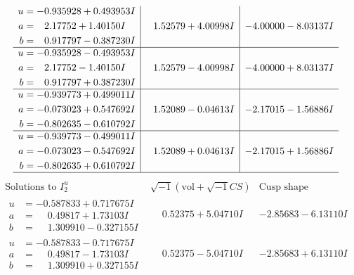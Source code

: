 \documentclass[1p]{elsarticle_modified}
\theoremstyle{definition}
\newcommand{\I}{\sqrt{-1}}
\begin{document}
$$\begin{array}{c|c|c}
\begin{aligned}
u &= -0.935928 + 0.493953 I \\
a &= \phantom{-}2.17752 + 1.40150 I \\
b &= \phantom{-}0.917797 - 0.387230 I\end{aligned}
 & \phantom{-}1.52579 + 4.00998 I & -4.00000 - 8.03137 I \\ \hline\begin{aligned}
u &= -0.935928 - 0.493953 I \\
a &= \phantom{-}2.17752 - 1.40150 I \\
b &= \phantom{-}0.917797 + 0.387230 I\end{aligned}
 & \phantom{-}1.52579 - 4.00998 I & -4.00000 + 8.03137 I \\ \hline\begin{aligned}
u &= -0.939773 + 0.499011 I \\
a &= -0.073023 + 0.547692 I \\
b &= -0.802635 - 0.610792 I\end{aligned}
 & \phantom{-}1.52089 - 0.04613 I & -2.17015 - 1.56886 I \\ \hline\begin{aligned}
u &= -0.939773 - 0.499011 I \\
a &= -0.073023 - 0.547692 I \\
b &= -0.802635 + 0.610792 I\end{aligned}
 & \phantom{-}1.52089 + 0.04613 I & -2.17015 + 1.56886 I\\
 \hline 
 \end{array}$$\newpage$$\begin{array}{c|c|c}  
\text{Solutions to }I^u_{2}& \I (\text{vol} + \sqrt{-1}CS) & \text{Cusp shape}\\
 \hline 
\begin{aligned}
u &= -0.587833 + 0.717675 I \\
a &= \phantom{-}0.49817 + 1.73103 I \\
b &= \phantom{-}1.309910 - 0.327155 I\end{aligned}
 & \phantom{-}0.52375 + 5.04710 I & -2.85683 - 6.13110 I \\ \hline\begin{aligned}
u &= -0.587833 - 0.717675 I \\
a &= \phantom{-}0.49817 - 1.73103 I \\
b &= \phantom{-}1.309910 + 0.327155 I\end{aligned}
 & \phantom{-}0.52375 - 5.04710 I & -2.85683 + 6.13110 I \\ \hline\begin{aligned}

\end{aligned}
\end{array}$$
\end{document}
